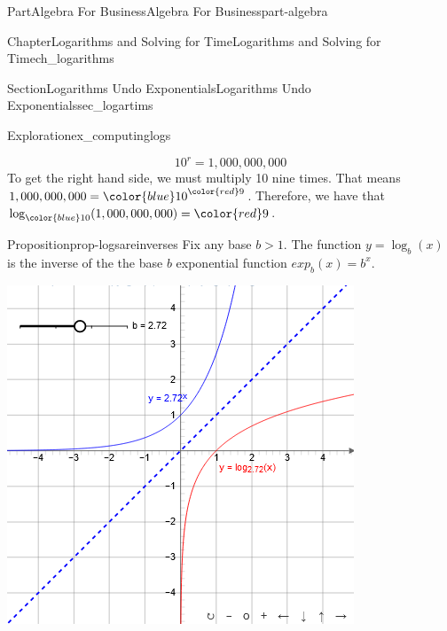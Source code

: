 \documentclass[oneside,10pt,]{tufte-book}
\numberwithin{equation}{chapter}
\begin{document}
\begin{partptx}{Part}{Algebra For Business}{}{Algebra For Business}{}{}{part-algebra}
\begin{chapterptx}{Chapter}{Logarithms and Solving for Time}{}{Logarithms and Solving for Time}{}{}{ch_logarithms}
\begin{sectionptx}{Section}{Logarithms Undo Exponentials}{}{Logarithms Undo Exponentials}{}{}{sec_logartims}
\begin{exploration}{Exploration}{}{ex_computinglogs}
\begin{enumerate}[font=\bfseries,label=(\alph*),ref=\alph*]
\begin{equation*}
10^r = 1,000,000,000
\end{equation*}
To get the right hand side, we must multiply 10 nine times.  That means \(1,000,000,000 = {\color{blue}10}^{\color{red}9}\).  Therefore, we have that \(\log_{\color{blue} 10} (1,000,000,000) = {\color{red}9}\).%
\end{enumerate}%
\end{exploration}%
\begin{proposition}{Proposition}{}{}{prop-logsareinverses}%
Fix any base \(b>1\). The function \(y = \log_b(x)\) is the inverse of the the base \(b\) exponential function \(exp_b(x) = b^x\).%
\end{proposition}
\begin{sidebyside}{2}{0.075}{0.075}{0.17}%
\begin{sbspanel}{0.47}%
\includegraphics[width=\linewidth]{external/jsxgraph-algebra-loggraph.png}
\end{sbspanel}%
\begin{sbspanel}{0.21}%

\end{sbspanel}
\end{sidebyside}
\end{sectionptx}
\end{chapterptx}
\end{partptx}
\end{document}

